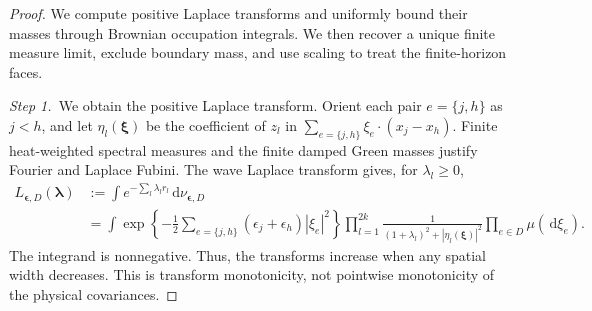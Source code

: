 \documentclass[12pt,oneside,openany]{book}
\numberwithin{equation}{section}
\theoremstyle{nogostyle}
\theoremstyle{definition}
\newcommand{\ud}{\,\mathrm{d}}
\begin{document}
\begin{proof}
  We compute positive Laplace transforms and uniformly bound their masses
  through Brownian occupation integrals. We then recover a unique finite
  measure limit, exclude boundary mass, and use scaling to treat the
  finite-horizon faces.


  \medskip
  \noindent\textit{Step 1.~}We obtain the positive Laplace transform.
  Orient each pair $e = \{j,h\}$ as $j < h$, and let $\eta_l(\boldsymbol\xi)$ be
  the coefficient of $z_l$ in $\sum_{e=\{j,h\}}\xi_e\cdot(x_j-x_h)$. Finite
  heat-weighted spectral measures and the finite damped Green masses justify
  Fourier and Laplace Fubini. The wave Laplace transform gives, for $\lambda_l
  \ge 0$,
  \begin{equation}\label{E:spatial-positive-laplace}
    \begin{split}
      L_{\boldsymbol\epsilon,D}(\boldsymbol\lambda)
      &:=\int e^{-\sum_l\lambda_l r_l}\ud\nu_{\boldsymbol\epsilon,D}\\
      &=\int\exp\left\{-\frac12\sum_{e=\{j,h\}}
      (\epsilon_j+\epsilon_h)|\xi_e|^2\right\}
      \prod_{l=1}^{2k}\frac1{(1+\lambda_l)^2+|\eta_l(\boldsymbol\xi)|^2}
      \prod_{e\in D}\mu(\ud\xi_e).
    \end{split}
  \end{equation}
  The integrand is nonnegative. Thus, the transforms increase when any spatial
  width decreases. This is transform monotonicity, not pointwise monotonicity of
  the physical covariances.



\end{proof}
\end{document}
